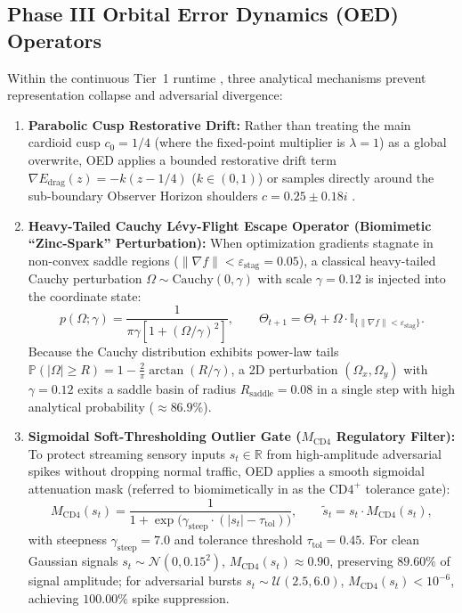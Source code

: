 \documentclass[10pt,a4paper]{article}
\begin{document}
\subsection{Phase III Orbital Error Dynamics (OED) Operators}
Within the continuous Tier~1 runtime \cite{dagli2026oed}, three analytical mechanisms prevent representation collapse and adversarial divergence:
\begin{enumerate}[leftmargin=1.6em,itemsep=2pt,topsep=2pt]
    \item \textbf{Parabolic Cusp Restorative Drift:} Rather than treating the main cardioid cusp $c_0 = 1/4$ (where the fixed-point multiplier is $\lambda = 1$) as a global overwrite, OED applies a bounded restorative drift term $\nabla E_{\text{drag}}(z) = -k(z - 1/4)$ ($k \in (0,1)$) or samples directly around the sub-boundary Observer Horizon shoulders $c = 0.25 \pm 0.18i$ \cite{dagli2026oed}.
    \item \textbf{Heavy-Tailed Cauchy L\'{e}vy-Flight Escape Operator (Biomimetic ``Zinc-Spark'' Perturbation):} When optimization gradients stagnate in non-convex saddle regions ($\|\nabla f\| < \varepsilon_{\text{stag}} = 0.05$), a classical heavy-tailed Cauchy perturbation $\Omega \sim \text{Cauchy}(0, \gamma)$ with scale $\gamma = 0.12$ is injected into the coordinate state:
    \begin{equation}
        p(\Omega; \gamma) = \frac{1}{\pi \gamma \left[1 + (\Omega/\gamma)^2\right]}, \qquad \Theta_{t+1} = \Theta_t + \Omega \cdot \mathbb{I}_{\{\|\nabla f\| < \varepsilon_{\text{stag}}\}}.
    \end{equation}
    Because the Cauchy distribution exhibits power-law tails $\mathbb{P}(|\Omega| \ge R) = 1 - \frac{2}{\pi}\arctan(R/\gamma)$, a 2D perturbation $(\Omega_x, \Omega_y)$ with $\gamma = 0.12$ exits a saddle basin of radius $R_{\text{saddle}} = 0.08$ in a single step with high analytical probability ($\approx 86.9\%$).
    \item \textbf{Sigmoidal Soft-Thresholding Outlier Gate ($M_{\text{CD4}}$ Regulatory Filter):} To protect streaming sensory inputs $s_t \in \mathbb{R}$ from high-amplitude adversarial spikes without dropping normal traffic, OED applies a smooth sigmoidal attenuation mask (referred to biomimetically in \cite{dagli2026oed} as the $\text{CD4}^+$ tolerance gate):
    \begin{equation}
        M_{\text{CD4}}(s_t) = \frac{1}{1 + \exp\!\big(\gamma_{\text{steep}} \cdot (|s_t| - \tau_{\text{tol}})\big)}, \qquad \tilde{s}_t = s_t \cdot M_{\text{CD4}}(s_t),
    \end{equation}
    with steepness $\gamma_{\text{steep}} = 7.0$ and tolerance threshold $\tau_{\text{tol}} = 0.45$. For clean Gaussian signals $s_t \sim \mathcal{N}(0, 0.15^2)$, $M_{\text{CD4}}(s_t) \approx 0.90$, preserving $89.60\%$ of signal amplitude; for adversarial bursts $s_t \sim \mathcal{U}(2.5, 6.0)$, $M_{\text{CD4}}(s_t) < 10^{-6}$, achieving $100.00\%$ spike suppression.
\end{enumerate}
\end{document}
